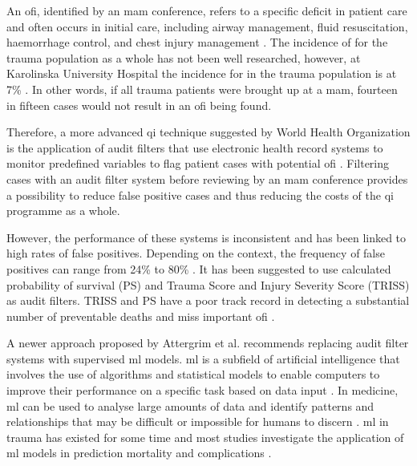 \documentclass[12pt, a4paper]{article}
\begin{document}
An \acrshort{ofi}, identified by an \acrshort{mam} conference, refers to a specific deficit in patient care and often
occurs in initial care, including airway management, fluid resuscitation, haemorrhage control, and chest injury
management
\cite{world_health_organization_guidelines_2009,roy_learning_2017,oreilly_opportunities_2013,sanddal_analysis_2011}.
The incidence of  for the trauma population as a whole has not been well researched, however, at
Karolinska University Hospital the incidence for  in the trauma population is at 7\%
\cite{attergrim_predicting_2023}. In other words, if all trauma patients were brought up at a \acrshort{mam}, fourteen
in fifteen cases would not result in an \acrshort{ofi} being found.

Therefore, a more advanced \acrshort{qi} technique suggested by World Health Organization is the application of audit
filters that use electronic health record systems to monitor predefined variables to flag patient cases with potential
\acrfull{ofi} \cite{world_health_organization_guidelines_2009}. Filtering cases with an audit filter system before
reviewing by an \acrshort{mam} conference provides a possibility to reduce false positive cases and thus reducing the
costs of the \acrshort{qi} programme as a whole.

However, the performance of these systems is inconsistent and has been linked to high rates of false positives.
Depending on the context, the frequency of false positives can range from 24\% to 80\%
\cite{attergrim_predicting_2023,sanddal_analysis_2011,roy_learning_2017,ghorbani_analysis_2018}. It has been suggested
to use calculated probability of survival (PS) and Trauma Score and Injury Severity Score (TRISS) as audit filters.
TRISS and PS have a poor track record in detecting a substantial number of preventable deaths and miss important
\acrshort{ofi} \cite{heim_survival_2016}.

A newer approach proposed by Attergrim et al. \cite{attergrim_predicting_2023} recommends replacing audit filter
systems with supervised \acrfull{ml} models. \acrshort{ml} is a subfield of artificial intelligence that involves the
use of algorithms and statistical models to enable computers to improve their performance on a specific task based on
data input \cite{greener_guide_2022}. In medicine, \acrshort{ml} can be used to analyse large amounts of data and
identify patterns and relationships that may be difficult or impossible for humans to discern
\cite{greener_guide_2022}. \acrshort{ml} in trauma has existed for some time and most studies investigate the
application of \acrshort{ml} models in prediction mortality and complications \cite{zhang_machine_2022}.
\end{document}

